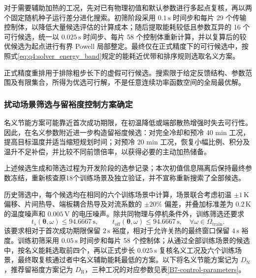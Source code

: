 \documentclass[bwprint]{gmcmthesis}
\numberwithin{equation}{section}
\numberwithin{figure}{section}
\begin{document}
对于需要辅助加热的工况，先对已有物理初值和默认参数进行多起点复核，再以两个固定随机种子运行差分进化搜索。初筛阶段采用 \(0.1\,\mathrm s\) 时间步和每片 29 个传输控制体，以降低大量候选评估的计算成本；随后提取能耗较低且参数互异的 16 个可行候选，统一以 \(0.025\,\mathrm s\) 时间步、每片 58 个控制体重新计算，并以复算后的较优候选为起点进行有界 Powell 局部整定。最终仅在正式精度下的可行候选中，按照式\eqref{eq:q4:solver_energy_band}规定的能耗近优带和排序规则选取名义方案。

正式精度重排用于排除粗步长下的虚假可行候选。搜索限于给定反馈结构、参数范围及有限集合，所得为优选可行解，不是任意连续功率函数空间的全局最优解。

\subsubsection{扰动场景筛选与留裕度控制方案确定}
名义节能方案可能靠近首次成功期限，在初温降低或端部散热增强时失去可行性。因此，在名义参数附近进一步构造留裕度候选：对完全冷却和预冷 40 min 工况，提高目标温度并适当缩短规划时间；对预冷 20 min 工况，恢复小幅比例、积分及温升不足补偿，并比较不同前馈倍率，以获得必要的主动加热储备。

上述候选生成和筛选过程为开发阶段的选参记录；本次初值信息隔离后保持最终参数冻结，重新核查原18个训练场景及独立验证，并不宣称重新搜索了全部候选。

历史筛选中，每个候选均在相同的六个训练场景中计算，场景联合考虑初温 \(\pm1\,\mathrm K\) 偏移、片间热导、端板耦合热导及对流系数的 \(\pm20\%\) 偏差，并叠加标准差为 \(0.2\,\mathrm K\) 的温度噪声和 \(0.005\,\mathrm V\) 的电压噪声。除共同物理与停机条件外，训练筛选还要求
\begin{equation}
t_s(\boldsymbol\theta,\omega)\leq94.6667\,\mathrm s,\qquad
t_{\mathrm{off}}(\boldsymbol\theta,\omega)\leq94.6667\,\mathrm s,
\quad \forall\omega\in\Omega_{\mathrm{train}}.
\label{eq:q4:solver_training_deadline}
\end{equation}
该要求相对于首次成功期限保留 \(2\,\mathrm s\) 裕度，相对于允许关热的最终窗口保留 \(4\,\mathrm s\) 裕度。训练初筛采用 \(0.05\,\mathrm s\) 时间步和每片 58 个控制体；从通过全部训练场景的候选中，按名义能耗选取前四个，再以正式步长 \(0.025\,\mathrm s\) 复核名义工况及六个训练场景，最终取复核通过者中名义辅助能耗最低的方案。以下将名义节能方案记为 \(D_{\mathrm N}\)，推荐留裕度方案记为 \(D_{\mathrm R}\)，三种工况的对应参数见表\ref{B7-control-parameters}。
\end{document}
